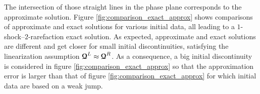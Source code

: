 The intersection of those straight lines in the phase plane corresponds to the approximate solution. Figure \ref{fig:comparison_exact_approx} shows comparisons of approximate and exact solutions for various initial data, all leading to a $1$-shock--$2$-rarefaction exact solution. As expected, approximate and exact solutions are different and get closer for small initial discontinuities, satisfying the linearization assumption ${\boldsymbol{\mathcal{Q}}}^L\approx {\boldsymbol{\mathcal{Q}}}^R$. As a consequence, a big initial discontinuity is considered in figure \ref{fig:comparison_exact_approx} so that the approximation error is larger than that of figure \ref{fig:comparison_exact_approx} for which initial data are based on a weak jump.


